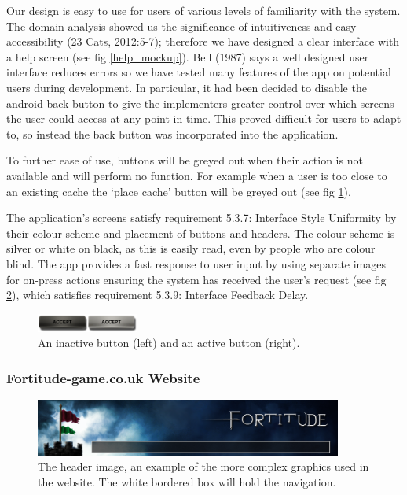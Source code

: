 Our design is easy to use for users of various levels of familiarity with the system. The domain analysis showed us the significance of intuitiveness and easy accessibility (23 Cats, 2012:5-7); therefore we have designed a clear interface with a help screen (see fig \ref{help_mockup}). Bell (1987) says a well designed user interface reduces errors so we have tested many features of the app on potential users during development. In particular, it had been decided to disable the android back button to give the implementers greater control over which screens the user could access at any point in time. This proved difficult for users to adapt to, so instead the back button was incorporated into the application.

To further ease of use, buttons will be greyed out when their action is not available and will perform no function. For example when a user is too close to an existing cache the `place cache' button will be greyed out (see fig \ref{buttons}).

The application's screens satisfy requirement 5.3.7: Interface Style Uniformity by their colour scheme and placement of buttons and headers. The colour scheme is silver or white on black, as this is easily read, even by people who are colour blind. The app provides a fast response to user input by using separate images for on-press actions ensuring the system has received the user's request (see fig \ref{website_header_background}), which satisfies requirement 5.3.9: Interface Feedback Delay.

\begin{figure}[ht]
	\vspace{-10pt}
	\begin{center}
	\includegraphics[width=0.3\textwidth]{images/buttons}
	\vspace{-10pt}
	\caption{An inactive button (left) and an active button (right).}
	\label{buttons}
	\end{center}
\end{figure}

\subsubsection{Fortitude-game.co.uk Website}

\begin{figure}[ht]
	\begin{center}
	\includegraphics[width=0.9\textwidth]{images/website_header_background}
	\caption{The header image, an example of the more complex graphics used in the website. The white bordered box will hold the navigation.}
	\label{website_header_background}
	\end{center}
	\vspace{-20pt}
\end{figure}

